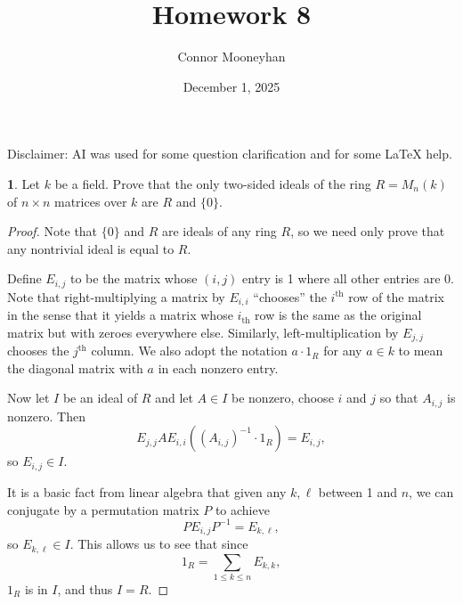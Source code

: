 \documentclass[12pt]{article}
\title{Homework 8}
\author{Connor Mooneyhan}
\date{December 1, 2025}
\theoremstyle{definition}
\newtheorem{ex}{}
\begin{document}
\maketitle

Disclaimer: AI was used for some question clarification and for some LaTeX help.

\begin{ex}
	Let $k$ be a field.
	Prove that the only two-sided ideals of the ring $R = M_n(k)$ of $n \times n$ matrices over $k$ are $R$ and $\lbrace 0 \rbrace$.
\end{ex}
\begin{proof}
	Note that $\lbrace 0 \rbrace$ and $R$ are ideals of any ring $R$, so we need only prove that any nontrivial ideal is equal to $R$.

	Define $E_{i,j}$ to be the matrix whose $(i, j)$ entry is 1 where all other entries are 0.
	Note that right-multiplying a matrix by $E_{i,i}$ ``chooses'' the $i^\text{th}$ row of the matrix in the sense that it yields a matrix whose $i_\text{th}$ row is the same as the original matrix but with zeroes everywhere else.
	Similarly, left-multiplication by $E_{j,j}$ chooses the $j^\text{th}$ column.
	We also adopt the notation $a \cdot 1_R$ for any $a \in k$ to mean the diagonal matrix with $a$ in each nonzero entry.

	Now let $I$ be an ideal of $R$ and let $A \in I$ be nonzero, choose $i$ and $j$ so that $A_{i,j}$ is nonzero.
	Then \begin{equation*}
		E_{j,j}AE_{i,i}\left((A_{i,j})^{-1} \cdot 1_R\right) = E_{i,j},
	\end{equation*}
	so $E_{i,j} \in I$.

	It is a basic fact from linear algebra that given any $k, \ell$ between 1 and $n$, we can conjugate by a permutation matrix $P$ to achieve \begin{equation*}
		PE_{i,j}P^{-1} = E_{k, \ell},
	\end{equation*}
	so $E_{k, \ell} \in I$.
	This allows us to see that since \begin{equation*}
		1_R = \sum_{1 \leq k \leq n} E_{k, k},
	\end{equation*} $1_R$ is in $I$, and thus $I = R$.
\end{proof}
\end{document}
